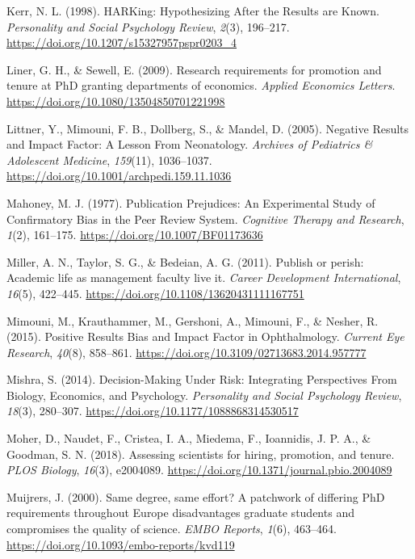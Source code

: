 \documentclass[
  british,
  a4paper,
  ,man,mask,floatsintext]{apa6}
\newlength{\cslhangindent}
\newenvironment{CSLReferences}[2] %
 {\begin{list}{}{%
  \setlength{\itemindent}{0pt}
  \setlength{\leftmargin}{0pt}
  \setlength{\parsep}{0pt}
  \ifodd #1
   \setlength{\leftmargin}{\cslhangindent}
   \setlength{\itemindent}{-1\cslhangindent}
  \fi
  \setlength{\itemsep}{#2\baselineskip}}}
 {\end{list}}
\begin{document}
\begin{CSLReferences}{1}{0}
Kerr, N. L. (1998). {HARKing}: {Hypothesizing After} the {Results} are {Known}. \emph{Personality and Social Psychology Review}, \emph{2}(3), 196--217. \url{https://doi.org/10.1207/s15327957pspr0203_4}

Liner, G. H., \& Sewell, E. (2009). Research requirements for promotion and tenure at {PhD} granting departments of economics. \emph{Applied Economics Letters}. \url{https://doi.org/10.1080/13504850701221998}

Littner, Y., Mimouni, F. B., Dollberg, S., \& Mandel, D. (2005). Negative {Results} and {Impact Factor}: {A Lesson From Neonatology}. \emph{Archives of Pediatrics \& Adolescent Medicine}, \emph{159}(11), 1036--1037. \url{https://doi.org/10.1001/archpedi.159.11.1036}

Mahoney, M. J. (1977). Publication {Prejudices}: {An Experimental Study} of {Confirmatory Bias} in the {Peer Review System}. \emph{Cognitive Therapy and Research}, \emph{1}(2), 161--175. \url{https://doi.org/10.1007/BF01173636}

Miller, A. N., Taylor, S. G., \& Bedeian, A. G. (2011). Publish or perish: Academic life as management faculty live it. \emph{Career Development International}, \emph{16}(5), 422--445. \url{https://doi.org/10.1108/13620431111167751}

Mimouni, M., Krauthammer, M., Gershoni, A., Mimouni, F., \& Nesher, R. (2015). Positive {Results Bias} and {Impact Factor} in {Ophthalmology}. \emph{Current Eye Research}, \emph{40}(8), 858--861. \url{https://doi.org/10.3109/02713683.2014.957777}

Mishra, S. (2014). Decision-{Making Under Risk}: {Integrating Perspectives From Biology}, {Economics}, and {Psychology}. \emph{Personality and Social Psychology Review}, \emph{18}(3), 280--307. \url{https://doi.org/10.1177/1088868314530517}

Moher, D., Naudet, F., Cristea, I. A., Miedema, F., Ioannidis, J. P. A., \& Goodman, S. N. (2018). Assessing scientists for hiring, promotion, and tenure. \emph{PLOS Biology}, \emph{16}(3), e2004089. \url{https://doi.org/10.1371/journal.pbio.2004089}

Muijrers, J. (2000). Same degree, same effort? {A} patchwork of differing {PhD} requirements throughout {Europe} disadvantages graduate students and compromises the quality of science. \emph{EMBO Reports}, \emph{1}(6), 463--464. \url{https://doi.org/10.1093/embo-reports/kvd119}


\end{CSLReferences}
\end{document}
